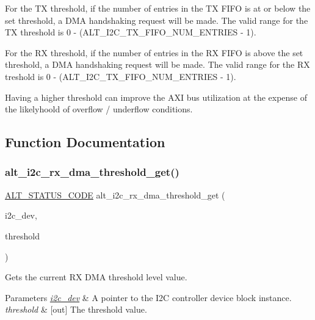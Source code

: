 For the TX threshold, if the number of entries in the TX F\+I\+FO is at or below the set threshold, a D\+MA handshaking request will be made. The valid range for the TX threshold is 0 -\/ (A\+L\+T\+\_\+\+I2\+C\+\_\+\+T\+X\+\_\+\+F\+I\+F\+O\+\_\+\+N\+U\+M\+\_\+\+E\+N\+T\+R\+I\+ES -\/ 1).

For the RX threshold, if the number of entries in the RX F\+I\+FO is above the set threshold, a D\+MA handshaking request will be made. The valid range for the RX treshold is 0 -\/ (A\+L\+T\+\_\+\+I2\+C\+\_\+\+T\+X\+\_\+\+F\+I\+F\+O\+\_\+\+N\+U\+M\+\_\+\+E\+N\+T\+R\+I\+ES -\/ 1).

Having a higher threshold can improve the A\+XI bus utilization at the expense of the likelyhoold of overflow / underflow conditions. 

\subsection{Function Documentation}
\mbox{\label{group__ALT__I2C__DMA_ga7424ca160282d4131f918000f7c6f6c1}} 
\subsubsection{\texorpdfstring{alt\_i2c\_rx\_dma\_threshold\_get()}{alt\_i2c\_rx\_dma\_threshold\_get()}}
{\footnotesize\ttfamily \mbox{\hyperlink{hwlib_8h_abdb0d369f069723ca55d6c94bcaaaa12}{A\+L\+T\+\_\+\+S\+T\+A\+T\+U\+S\+\_\+\+C\+O\+DE}} alt\+\_\+i2c\+\_\+rx\+\_\+dma\+\_\+threshold\+\_\+get (\begin{DoxyParamCaption}\item[{\mbox{\hyperlink{structALT__I2C__DEV__s}{A\+L\+T\+\_\+\+I2\+C\+\_\+\+D\+E\+V\+\_\+t}} $\ast$}]{i2c\+\_\+dev,  }\item[{uint8\+\_\+t $\ast$}]{threshold }\end{DoxyParamCaption})}

Gets the current RX D\+MA threshold level value.


\begin{DoxyParams}{Parameters}
{\em \mbox{\hyperlink{structi2c__dev}{i2c\+\_\+dev}}} & A pointer to the I2C controller device block instance.\\
\hline
{\em threshold} & \mbox{[}out\mbox{]} The threshold value.\\
\hline
\end{DoxyParams}

